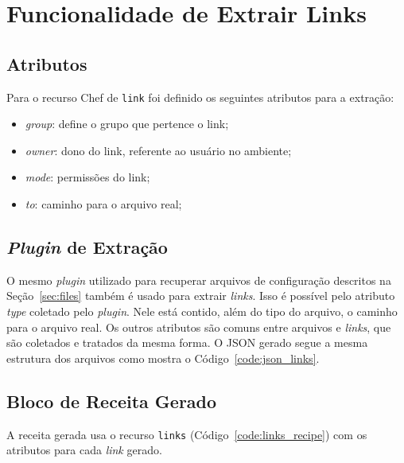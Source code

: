 \section{Funcionalidade de Extrair Links}
\label{sec:links}

\subsection{Atributos}
Para o recurso Chef de \texttt{link} foi definido os seguintes
atributos para a extração:

\begin{itemize}
  \item \textit{group}: define o grupo que pertence o link;
  \item \textit{owner}: dono do link, referente ao usuário no ambiente;
  \item \textit{mode}: permissões do link;
  \item \textit{to}: caminho para o arquivo real;
\end{itemize}

\subsection{\textit{Plugin} de Extração}

O mesmo \textit{plugin} utilizado para recuperar arquivos de configuração descritos
na Seção~\ref{sec:files} também é usado para extrair \textit{links}. Isso é possível
pelo atributo \textit{type} coletado pelo \textit{plugin}. Nele está contido, além do tipo do arquivo,
o caminho para o arquivo real. Os outros atributos são comuns entre arquivos e
\textit{links}, que são coletados e tratados da mesma forma. O JSON gerado segue a
mesma estrutura dos arquivos como mostra o Código~\ref{code:json_links}.

\noindent\begin{minipage}{\textwidth}
  \lstset{style=shell}
  
\end{minipage}\hfill

\subsection{Bloco de Receita Gerado}

A receita gerada usa o recurso \texttt{links} (Código~\ref{code:links_recipe}) com os
atributos para cada \textit{link} gerado.

